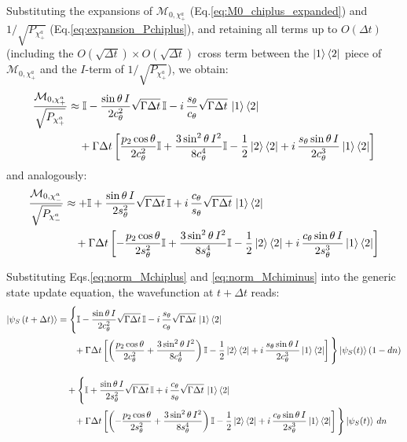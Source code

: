 \documentclass[a4paper,12pt]{article}
\begin{document}
Substituting the expansions of $\mathcal{M}_{0,\chi_{+}^{a}}$ 
(Eq.\ref{eq:M0_chiplus_expanded}) and $1/\sqrt{P_{\chi_{+}^{a}}}$ 
(Eq.\ref{eq:expansion_Pchiplus}), and retaining all terms up to $O(\Delta t)$ 
(including the $O(\sqrt{\Delta t})\times O(\sqrt{\Delta t})$ cross term between the 
$\ket{1}\bra{2}$ piece of $\mathcal{M}_{0,\chi_{+}^{a}}$ and the $I$-term of 
$1/\sqrt{P_{\chi_{+}^{a}}}$), we obtain:
\begin{align}
	\frac{\mathcal{M}_{0,\chi_{+}^{a}}}{\sqrt{P_{\chi_{+}^{a}}}} &\approx 
	\mathbb{I} - \frac{\sin\theta\, I}{2c_{\theta}^{2}}\sqrt{\Gamma\Delta t}\,\mathbb{I} 
	- i\,\frac{s_{\theta}}{c_{\theta}}\sqrt{\Gamma\Delta t}\,\ket{1}\bra{2} \notag \\
	&\quad + \Gamma\Delta t \left[ \frac{p_{2}\cos\theta}{2c_{\theta}^{2}}\mathbb{I} 
	+ \frac{3\sin^{2}\theta\, I^{2}}{8c_{\theta}^{4}}\mathbb{I} 
	- \frac{1}{2}\ket{2}\bra{2} 
	+ i\,\frac{s_{\theta}\sin\theta\, I}{2c_{\theta}^{3}}\ket{1}\bra{2} \right]
	\label{eq:norm_Mchiplus}
\end{align}
and analogously:
\begin{align}
	\frac{\mathcal{M}_{0,\chi_{-}^{a}}}{\sqrt{P_{\chi_{-}^{a}}}} &\approx 
	+\mathbb{I} + \frac{\sin\theta\, I}{2s_{\theta}^{2}}\sqrt{\Gamma\Delta t}\,\mathbb{I} 
	+ i\,\frac{c_{\theta}}{s_{\theta}}\sqrt{\Gamma\Delta t}\,\ket{1}\bra{2} \notag \\
	&\quad + \Gamma\Delta t \left[ -  \frac{p_{2}\cos\theta}{2s_{\theta}^{2}}\mathbb{I} 
	+ \frac{3\sin^{2}\theta\, I^{2}}{8s_{\theta}^{4}}\mathbb{I} 
	- \frac{1}{2}\ket{2}\bra{2} 
	+ i\,\frac{c_{\theta}\sin\theta\, I}{2s_{\theta}^{3}}\ket{1}\bra{2} \right]
	\label{eq:norm_Mchiminus}
\end{align}

Substituting Eqs.\ref{eq:norm_Mchiplus} and \ref{eq:norm_Mchiminus} into the 
generic state update equation, the wavefunction at $t+\Delta t$ reads:
\begin{align}
	\ket{\psi_{S}\left(t+\Delta t\right)} &= 
	\Bigg\{ \mathbb{I} - \frac{\sin\theta\, I}{2c_{\theta}^{2}}\sqrt{\Gamma\Delta t}\,\mathbb{I} 
	- i\,\frac{s_{\theta}}{c_{\theta}}\sqrt{\Gamma\Delta t}\,\ket{1}\bra{2} \notag \\
	&\hphantom{=\Bigg\{} + \Gamma\Delta t \left[ \left(\frac{p_{2}\cos\theta}{2c_{\theta}^{2}} 
	+ \frac{3\sin^{2}\theta\, I^{2}}{8c_{\theta}^{4}}\right)\mathbb{I} 
	- \frac{1}{2}\ket{2}\bra{2} 
	+ i\,\frac{s_{\theta}\sin\theta\, I}{2c_{\theta}^{3}}\ket{1}\bra{2} \right] \Bigg\} 
	\ket{\psi_{S}(t)} \left(1-dn\right) \notag \\[10pt]
	&\quad + \Bigg\{ \mathbb{I} + \frac{\sin\theta\, I}{2s_{\theta}^{2}}\sqrt{\Gamma\Delta t}\,\mathbb{I} 
	+ i\,\frac{c_{\theta}}{s_{\theta}}\sqrt{\Gamma\Delta t}\,\ket{1}\bra{2} \notag \\
	&\hphantom{=\Bigg\{} + \Gamma\Delta t \left[  \left( -\frac{p_{2}\cos\theta}{2s_{\theta}^{2}} 
	+ \frac{3\sin^{2}\theta\, I^{2}}{8s_{\theta}^{4}}\right)\mathbb{I} 
	- \frac{1}{2}\ket{2}\bra{2} 
	+ i\,\frac{c_{\theta}\sin\theta\, I}{2s_{\theta}^{3}}\ket{1}\bra{2} \right] \Bigg\} 
	\ket{\psi_{S}(t)} \, dn
	\label{eq:psi_t_plus_dt_photoemission_expanded}
\end{align}
\end{document}
